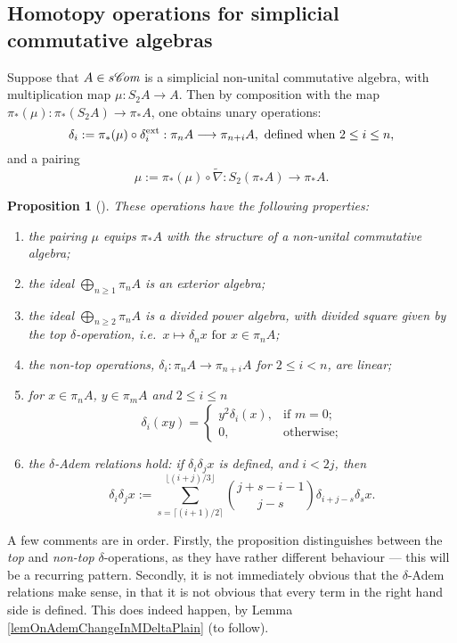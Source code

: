 \documentclass[11pt]{amsart} \renewcommand{\baselinestretch}{1.2}
\theoremstyle{plain}
\newtheorem{prop}[thm]{Proposition}
\numberwithin{equation}{section} %
\theoremstyle{plain}
\newtheorem{prop}[thm]{Proposition}
\numberwithin{equation}{chapter} %
\renewcommand{\to}{\longrightarrow}
\newcommand{\scrC}{\mathscr{C}}
\newcommand{\algs}{{\scrC\!\textit{\normalfont\textit{om}}}}
\renewcommand{\mapsto}{\longmapsto}
\newcommand{\SubsectionOrSection}[1]{\subsection{#1}}
\begin{document}
\begin{Constructing homotopy operations}
\SubsectionOrSection{Homotopy operations for simplicial commutative algebras}\label{Homotopy operations for simplicial commutative algebras}
Suppose that $A\in s \algs$ is a simplicial non-unital commutative algebra, with multiplication map $\mu:S_2A\to A$. Then by composition with the map $\pi_*(\mu):\pi_*(S_2A)\to \pi_*A$, one obtains unary operations:
\[\delta_i:=\pi_*(\mu)\circ\delta_i^\textup{ext}:\pi_nA\to \pi_{n+i}A,\textup{ defined when }2\leq i\leq n,\]
and a pairing\[\mu:=\pi_*(\mu)\circ\widetilde{\nabla}:S_2(\pi_*A)\to \pi_{*}A.\]
\begin{prop}[{\cite{DwyerHtpyOpsSimpComAlg.pdf}}]
\label{omnibus on htpy of simp algs}
These operations have the following properties:
\begin{enumerate}
\item the pairing $\mu$ equips $\pi_*A$ with  the structure of a non-unital commutative algebra;
\item the ideal $\bigoplus_{n\geq1}\pi_nA$ is an exterior algebra;
\item the ideal $\bigoplus_{n\geq2}\pi_nA$ is a divided power algebra, with divided square given by the \emph{top $\delta$-operation}, i.e.\ $x\mapsto \delta_nx\text{ for }x\in\pi_nA$;
\item the \emph{non-top operations}, $\delta_i:\pi_nA\to \pi_{n+i}A$ for $2\leq i<n$, are linear;
\item for $x\in\pi_nA$, $y\in \pi_mA$ and $2\leq i\leq n$
\[\delta_i(xy)=\begin{cases}
y^2\delta_i(x),&\text{if }m=0;\\
0,&\text{otherwise};
\end{cases}
\]
\item \label{deltaademsunstable} the \emph{$\delta$-Adem relations} hold: if $\delta_i\delta_jx$ is defined, and $i<2j$, then
\[\delta_i\delta_jx:=\sum_{s=\lceil(i+1)/2\rceil}^{\lfloor(i+j)/3\rfloor}\binom{j+s-i-1}{ j-s}\delta_{i+j-s}\delta_sx.\]
\end{enumerate}
\end{prop}
\noindent A few comments are in order. Firstly, the proposition distinguishes between the \emph{top} and \emph{non-top} $\delta$-operations, as they have rather different behaviour --- this will be a recurring pattern. Secondly, it is not immediately obvious that the $\delta$-Adem relations make sense, in that it is not obvious that every term in the right hand side is defined. This does indeed happen, by Lemma \ref{lemOnAdemChangeInMDeltaPlain} (to follow). 


\end{Constructing homotopy operations}
\end{document}
